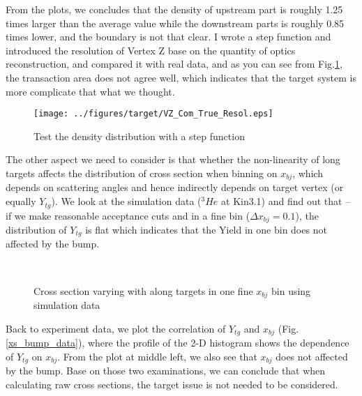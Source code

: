 \documentclass[a4paper,18.pt]{article}
\begin{document}
 From the plots, we concludes that the density of upstream part is roughly 1.25 times larger than the average value while the downstream parts is roughly 0.85 times lower, and the boundary is not that clear. I wrote a step function and introduced the resolution of Vertex Z base on the quantity of optics reconstruction, and compared it with real data, and as you can see from Fig.\ref{long_target_step}, the transaction area does not agree well, which indicates that the target system is more complicate that what we thought. 

\begin{figure}[ht]
 \begin{center}
  \texttt{[image: ../figures/target/VZ\_Com\_True\_Resol.eps]}
  \caption[Test the density distribution with a step function]{Test the density distribution with a step function}
  \label{long_target_step}
 \end{center}
\end{figure}

The other aspect we need to consider is that whether the non-linearity of long targets affects the distribution of cross section when binning on $x_{bj}$, which depends on scattering angles and hence indirectly depends on target vertex (or equally $Y_{tg}$). We look at the simulation data ($^{3}He$ at Kin3.1) and find out that -- if we make reasonable acceptance cuts and in a fine bin ($\Delta x_{bj} = 0.1$), the distribution of $Y_{tg}$ is flat which indicates that the Yield in one bin does not affected by the bump. 

\begin{figure}[!ht]
 \begin{center}
\\
  \caption[Cross section varying with along targets in simulation]{Cross section varying with along targets in one fine $x_{bj}$ bin using simulation data}
  \label{xs_bump_simu}
 \end{center}
\end{figure}

 Back to experiment data, we plot the correlation of $Y_{tg}$ and $x_{bj}$ (Fig.\ref{xs_bump_data}), where the profile of the 2-D histogram shows the dependence of $Y_{tg}$ on $x_{bj}$. From the plot at middle left, we also see that $x_{bj}$ does not affected by the bump. Base on those two examinations, we can conclude that when calculating raw cross sections, the target issue is not needed to be considered. 
\end{document}
